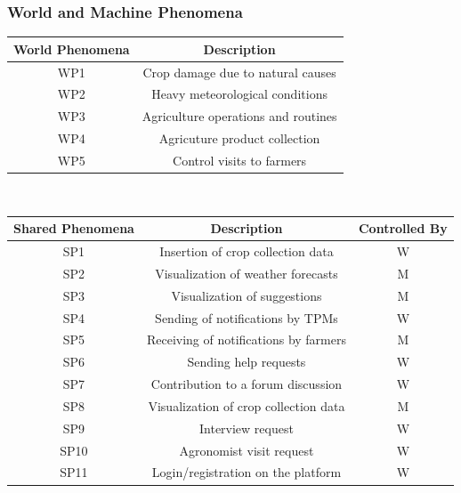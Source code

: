 \documentclass[10pt]{article}
\begin{document}
\subsubsection{World and Machine Phenomena}
\begin{center}
    \vspace{0.5cm}
    \begin{tabular}{|c c|} 
    \hline
    World Phenomena & Description \\ 
    \hline\hline
    WP1 & Crop damage due to natural causes \\ 
    \hline
    WP2 & Heavy meteorological conditions\\ 
    \hline
    WP3 & Agriculture operations and routines\\ 
    \hline
    WP4 & Agricuture product collection \\ 
    \hline
    WP5 & Control visits to farmers \\ 
    \hline
    \end{tabular}
    \vspace{0.5cm}\\
    \begin{tabular}{|c c c|} 
        \hline
        Shared Phenomena & Description & Controlled By\\ 
        \hline\hline
        SP1 & Insertion of crop collection data & W \\ 
        \hline
        SP2 & Visualization of weather forecasts & M \\ 
        \hline
        SP3 & Visualization of suggestions & M \\ 
        \hline
        SP4 & Sending of notifications by TPMs & W \\ 
        \hline
        SP5 & Receiving of notifications by farmers & M \\ 
        \hline
        SP6 & Sending help requests & W \\ 
        \hline
        SP7 & Contribution to a forum discussion & W \\ 
        \hline
        SP8 & Visualization of crop collection data & M \\ 
        \hline
        SP9 & Interview request & W \\ 
        \hline
        SP10 & Agronomist visit request & W \\ 
        \hline
        SP11 & Login/registration on the platform & W \\ 
        \hline
        \end{tabular}
\end{center}
\end{document}
